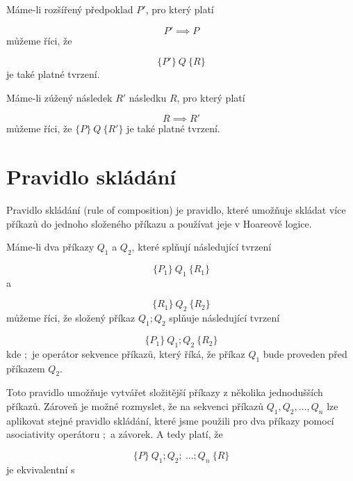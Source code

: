 Máme-li rozšířený předpoklad $P'$, pro který platí

\begin{equation*}
    P' \implies P
\end{equation*}
můžeme říci, že

\begin{equation*}
    \{ P' \} \  Q \  \{ R \}
\end{equation*}
je také platné tvrzení.

Máme-li zúžený následek $R'$ následku $R$, pro který platí

\begin{equation*}
    R \implies R'
\end{equation*}
můžeme říci, že $\{ P \} \  Q \  \{ R' \}$ je také platné tvrzení.

\section{Pravidlo skládání}
\label{sec:hoare-pravidlo-skladani}

Pravidlo skládání (rule of composition) je pravidlo, které umožňuje
skládat více příkazů do jednoho složeného příkazu a používat jeje v Hoareově logice.

Máme-li dva příkazy $Q_1$ a $Q_2$, které splňují následující tvrzení

\begin{equation*}
    \{ P_1 \} \  Q_1 \  \{ R_1 \}
\end{equation*}
a

\begin{equation*}
    \{ R_1 \} \  Q_2 \  \{ R_2 \}
\end{equation*}
můžeme říci, že složený příkaz $Q_1; Q_2$ splňuje následující tvrzení

\begin{equation*}
    \{ P_1 \} \  Q_1; Q_2 \  \{ R_2 \}
\end{equation*}
kde $;$ je operátor sekvence příkazů, který říká, že příkaz $Q_1$ bude proveden před příkazem $Q_2$.

Toto pravidlo umožňuje vytvářet složitější příkazy z několika jednodušších příkazů.
Zároveň je možné rozmyslet, že na sekvenci příkazů $Q_1, Q_2, \ldots, Q_n$
lze aplikovat stejné pravidlo skládání, které jsme použili pro dva příkazy
pomocí asociativity operátoru $;$ a závorek. A tedy platí, že

\begin{equation*}
    \{ P \} \  Q_1; Q_2; \  \ldots ; Q_n \  \{ R \}
\end{equation*}
je ekvivalentní s


